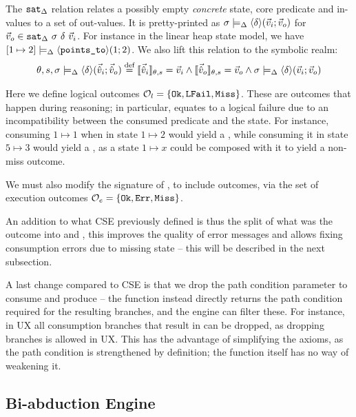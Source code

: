 The $\texttt{sat}_\Delta$ relation relates a possibly empty \emph{concrete} state, core predicate and in-values to a set of out-values. It is pretty-printed as $\sigma \models_{\Delta} \left<\delta\right>\!(\vec{v}_i;\vec{v}_o)$ for $\vec{v}_o \in \texttt{sat}_\Delta~\sigma~\delta~\vec{v}_i$. For instance in the linear heap state model, we have $[ 1 \mapsto 2 ] \models_{\Delta} \left<\texttt{points\_to}\right>\!(1;2)$. We also lift this relation to the symbolic realm: 
\begin{align*}
	\theta,s,\sigma\models_{\Delta} \left<\delta\right>\!(\vec{\hat{v}}_i;\vec{\hat{v}}_o) \stackrel{\textnormal{def}}= \llbracket\vec{\hat{v}}_i\rrbracket_{\theta,s}=\vec{v}_i \land \llbracket\vec{\hat{v}}_o\rrbracket_{\theta,s}=\vec{v}_o \land \sigma\models_{\Delta} \left<\delta\right>\!(\vec{v}_i;\vec{v}_o)
\end{align*}

Here we define logical outcomes ${\cal O}_l = \{\texttt{Ok}, \texttt{LFail}, \texttt{Miss} \}$. These are outcomes that happen during reasoning; in particular, \LFail{} equates to a logical failure due to an incompatibility between the consumed predicate and the state. For instance, consuming $1 \mapsto 1$ when in state $1 \mapsto 2$ would yield a \LFail{}, while consuming it in state $5 \mapsto 3$ would yield a \Miss{}, as a state $1\mapsto x$ could be composed with it to yield a non-miss outcome.

We must also modify the signature of \execac, to include \Miss{} outcomes, via the set of execution outcomes ${\cal O}_e=\{\texttt{Ok},\texttt{Err},\texttt{Miss}\}$.

An addition to what CSE previously defined is thus the split of what was the  outcome into \LFail{} and \Miss{}, this improves the quality of error messages and allows fixing consumption errors due to missing state -- this will be described in the next subsection.

A last change compared to CSE is that we drop the path condition parameter to consume and produce -- the function instead directly returns the path condition required for the resulting branches, and the engine can filter these. For instance, in UX all consumption branches that result in \LFail{} can be dropped, as dropping branches is allowed in UX. This has the advantage of simplifying the axioms, as the path condition is strengthened by definition; the function itself has no way of weakening it. 

\subsection{Bi-abduction Engine}

